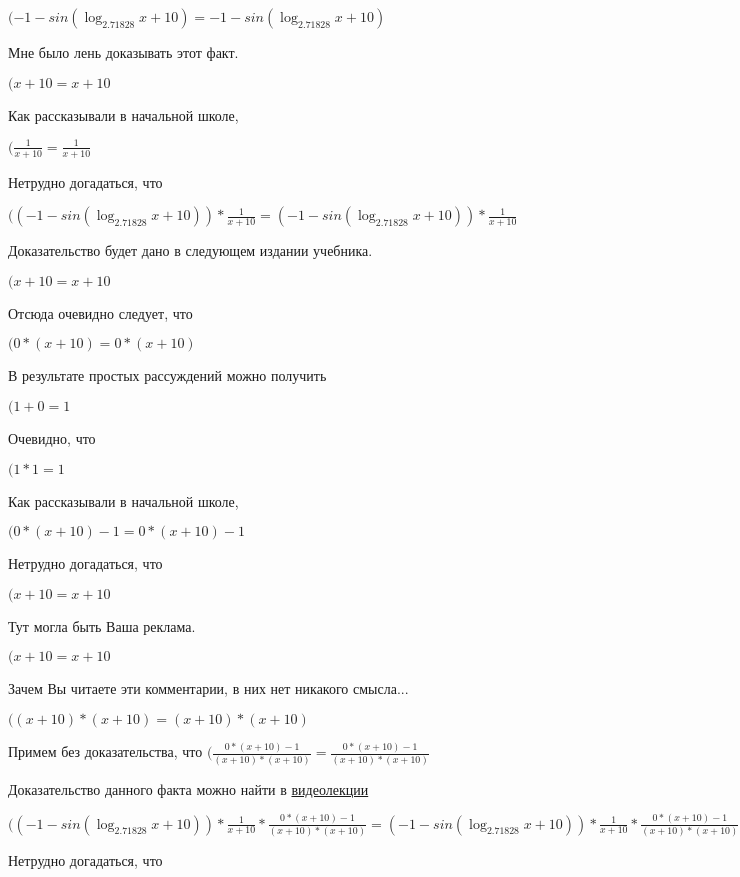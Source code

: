 \documentclass[12pt,a4paper,fleqn]{article}
\theoremstyle{definition}
\begin{document}
$( -1  - sin(\log_{ 2.71828 }{ x  +  10 }) =  -1  - sin(\log_{ 2.71828 }{ x  +  10 })$

Мне было лень доказывать этот факт.

$( x  +  10  =  x  +  10 $

Как рассказывали в начальной школе,

$(\frac{ 1 }{ x  +  10 }
 = \frac{ 1 }{ x  +  10 }
$

Нетрудно догадаться, что

$(( -1  - sin(\log_{ 2.71828 }{ x  +  10 })) * \frac{ 1 }{ x  +  10 }
 = ( -1  - sin(\log_{ 2.71828 }{ x  +  10 })) * \frac{ 1 }{ x  +  10 }
$

Доказательство будет дано в следующем издании учебника.

$( x  +  10  =  x  +  10 $

Отсюда очевидно следует, что

$( 0  * ( x  +  10 ) =  0  * ( x  +  10 )$

В результате простых рассуждений можно получить

$( 1  +  0  =  1 $

Очевидно, что

$( 1  *  1  =  1 $

Как рассказывали в начальной школе,

$( 0  * ( x  +  10 ) -  1  =  0  * ( x  +  10 ) -  1 $

Нетрудно догадаться, что

$( x  +  10  =  x  +  10 $

Тут могла быть Ваша реклама.

$( x  +  10  =  x  +  10 $

Зачем Вы читаете эти комментарии, в них нет никакого смысла...

$(( x  +  10 ) * ( x  +  10 ) = ( x  +  10 ) * ( x  +  10 )$

Примем без доказательства, что
$(\frac{ 0  * ( x  +  10 ) -  1 }{( x  +  10 ) * ( x  +  10 )}
 = \frac{ 0  * ( x  +  10 ) -  1 }{( x  +  10 ) * ( x  +  10 )}
$

Доказательство данного факта можно найти в \href{https://www.youtube.com/watch?v=dQw4w9WgXcQ}{видеолекции}

$(( -1  - sin(\log_{ 2.71828 }{ x  +  10 })) * \frac{ 1 }{ x  +  10 }
 * \frac{ 0  * ( x  +  10 ) -  1 }{( x  +  10 ) * ( x  +  10 )}
 = ( -1  - sin(\log_{ 2.71828 }{ x  +  10 })) * \frac{ 1 }{ x  +  10 }
 * \frac{ 0  * ( x  +  10 ) -  1 }{( x  +  10 ) * ( x  +  10 )}
$

Нетрудно догадаться, что
\end{document}

